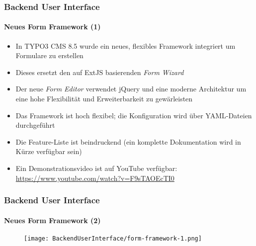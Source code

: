\begin{frame}[fragile]
	\frametitle{Backend User Interface}
	\framesubtitle{Neues Form Framework (1)}

	\begin{itemize}
		\item In TYPO3 CMS 8.5 wurde ein neues, flexibles Framework integriert um Formulare zu erstellen
		\item Dieses ersetzt den auf ExtJS basierenden \textit{Form Wizard}
		\item Der neue \textit{Form Editor} verwendet jQuery und  eine moderne Architektur um eine hohe Flexibilität und Erweiterbarkeit zu gewärleisten
		\item Das Framework ist hoch flexibel; die Konfiguration wird über YAML-Dateien durchgeführt
		\item Die Feature-Liste ist beindruckend\newline
			\small(ein komplette Dokumentation wird in Kürze verfügbar sein)\normalsize
		\item Ein Demonstrationsvideo ist auf YouTube verfügbar:\newline
			\url{https://www.youtube.com/watch?v=F9sTAOEcTI0}
	\end{itemize}

\end{frame}
\begin{frame}[fragile]
	\frametitle{Backend User Interface}
	\framesubtitle{Neues Form Framework (2)}

	\begin{figure}
		\texttt{[image: BackendUserInterface/form-framework-1.png]}
	\end{figure}

\end{frame}

